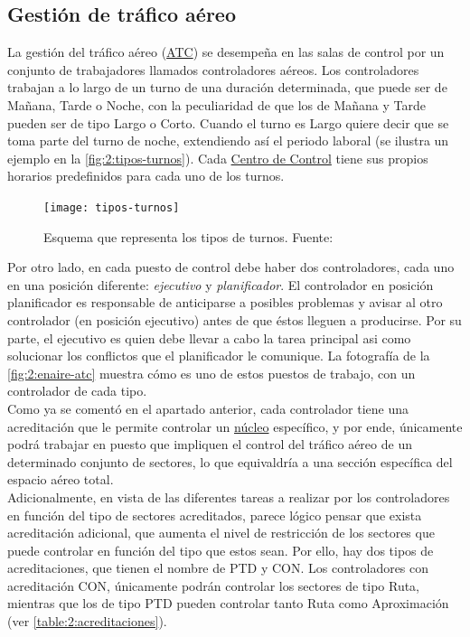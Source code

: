 \subsection{Gestión de tráfico aéreo}
La gestión del tráfico aéreo (\hyperref[ATC]{ATC}) se desempeña en las salas de control por un conjunto de trabajadores llamados controladores aéreos. Los controladores trabajan a lo largo de un turno de una duración determinada, que puede ser de Mañana, Tarde o Noche, con la peculiaridad de que los de Mañana y Tarde pueden ser de tipo Largo o Corto. Cuando el turno es Largo quiere decir que se toma parte del turno de noche, extendiendo así el periodo laboral (se ilustra un ejemplo en la \autoref{fig:2:tipos-turnos}). Cada \hyperref[ACC]{Centro de Control} tiene sus propios horarios predefinidos para cada uno de los turnos.

\begin{figure}
    \centering
    \texttt{[image: tipos-turnos]}
    \caption{Esquema que representa los tipos de turnos. Fuente:~\cite{articulo1}}
    \label{fig:2:tipos-turnos}
\end{figure}

Por otro lado, en cada puesto de control debe haber dos controladores, cada uno en una posición diferente: \textit{ejecutivo} y \textit{planificador}. El controlador en posición planificador es responsable de anticiparse a posibles problemas y avisar al otro controlador (en posición ejecutivo) antes de que éstos lleguen a producirse. Por su parte, el ejecutivo es quien debe llevar a cabo la tarea principal asi como solucionar los conflictos que el planificador le comunique. La fotografía de la \autoref{fig:2:enaire-atc} muestra cómo es uno de estos puestos de trabajo, con un controlador de cada tipo.
\\

Como ya se comentó en el apartado anterior, cada controlador tiene una acreditación que le permite controlar un \hyperref[Nucleo]{núcleo} específico, y por ende, únicamente podrá trabajar en puesto que impliquen el control del tráfico aéreo de un determinado conjunto de sectores, lo que equivaldría a una sección específica del espacio aéreo total.
\\

Adicionalmente, en vista de las diferentes tareas a realizar por los controladores en función del tipo de sectores acreditados, parece lógico pensar que exista acreditación adicional, que aumenta el nivel de restricción de los sectores que puede controlar en función del tipo que estos sean. Por ello, hay dos tipos de acreditaciones, que tienen el nombre de PTD y CON. Los controladores con acreditación CON, únicamente podrán controlar los sectores de tipo Ruta, mientras que los de tipo PTD pueden controlar tanto Ruta como Aproximación (ver \autoref{table:2:acreditaciones}).


